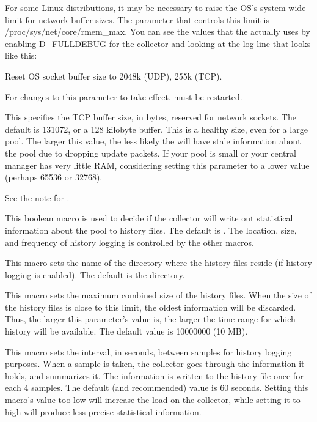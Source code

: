 \begin{description}
  \Note For some Linux distributions, it may be necessary to raise the
  OS's system-wide limit for network buffer sizes. The parameter that
  controls this limit is /proc/sys/net/core/rmem\_max. You can see the
  values that the  actually uses by enabling D\_FULLDEBUG
  for the collector and looking at the log line that looks like this:

  Reset OS socket buffer size to 2048k (UDP), 255k (TCP).

  For changes to this parameter to take effect,  must
  be restarted.

\label{param:CollectorTcpSocketBufsize}
\item[\Macro{COLLECTOR\_TCP\_SOCKET\_BUFSIZE}]
  This specifies the TCP buffer
  size, in  bytes, reserved for  network sockets.  The
  default is 131072, or a 128 kilobyte buffer.  This is a healthy size, even
  for a large pool.  The larger this value, the less likely the
   will have stale information about the pool due to
  dropping update packets.  If your pool is small or your central
  manager has very little RAM, considering setting this parameter to a
  lower value (perhaps 65536 or 32768).

  \Note See the note for .

\label{param:KeepPoolHistory}
\item[\Macro{KEEP\_POOL\_HISTORY}]
  This boolean macro is used to decide if the collector will write
  out statistical information about the pool to history files.
  The default is .
  The location, size, and frequency of history logging is controlled
  by the other macros.

\label{param:PoolHistoryDir}
\item[\Macro{POOL\_HISTORY\_DIR}]
  This macro sets the name of the directory where the history
  files reside (if history logging is enabled).
  The default is the  directory.

\label{param:PoolHistoryMaxStorage} 
\item[\Macro{POOL\_HISTORY\_MAX\_STORAGE}]
  This macro sets the maximum combined size of the history files.
  When the size of the history files is close to this limit, the oldest
  information will be discarded.
  Thus, the larger this parameter's value is, the larger the time
  range for which history will be available.  The default value is
  10000000 (10 MB).

\label{param:PoolHistorySamplingInterval}
\item[\Macro{POOL\_HISTORY\_SAMPLING\_INTERVAL}]
  This macro sets the interval, in seconds, between samples for
  history logging purposes. 
  When a sample is taken, the collector goes through the information
  it holds, and summarizes it.
  The information is written to the history file once for each 4
  samples.
  The default (and recommended) value is 60 seconds. Setting this
  macro's value too low will increase the load on the collector,
  while setting it to high will produce less precise statistical
  information.


\end{description}
